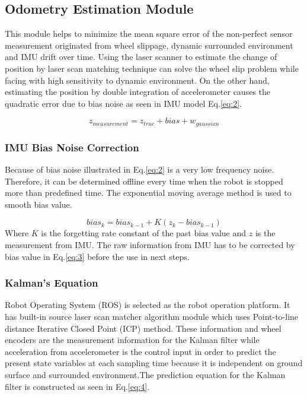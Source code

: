 \documentclass{llncs}
\newcommand{\md}[1]{\(#1\)}
\begin{document}
\subsection{Odometry Estimation Module}

This module helps to minimize the mean square error of the non-perfect sensor measurement originated from wheel slippage, dynamic surrounded environment and IMU drift over time. Using the laser scanner to estimate the change of position by laser scan matching technique can solve the wheel slip problem while facing with high sensitivity to dynamic environment. On the other hand, estimating the position by double integration of accelerometer causes the quadratic error due to bias noise as seen in IMU model Eq.\ref{eq:2}.

\begin{equation}
\label{eq:2}
z_{measurement} = z_{true} + bias + w_{gaussian}
\end{equation}

\subsubsection{IMU Bias Noise Correction}

Because of bias noise illustrated in Eq.\ref{eq:2} is a very low frequency noise. Therefore, it can be determined offline every time when the robot is stopped more than predefined time. The exponential moving average method is used to smooth bias value.

\begin{equation}
\label{eq:3}
bias_{k} = bias_{k-1} + K(z_{k} - bias_{k-1})
\end{equation}
Where \md{K} is the forgetting rate constant of the past bias value and \md{z} is the measurement from IMU. The raw information from IMU has to be corrected by bias value in Eq.\ref{eq:3} before the use in next steps.

\subsubsection{Kalman's Equation}

Robot Operating System (ROS) is selected as the robot operation platform. It has built-in source laser scan matcher algorithm module which uses Point-to-line distance Iterative Closed Point (ICP)\cite{icp1}\cite{icp2} method. These information and wheel encoders are the measurement information for the Kalman filter while acceleration from accelerometer is the control input in order to predict the present state variables at each sampling time because it is independent on ground surface and surrounded environment.The prediction equation for the Kalman filter is constructed as seen in Eq.\ref{eq:4}.
\end{document}
